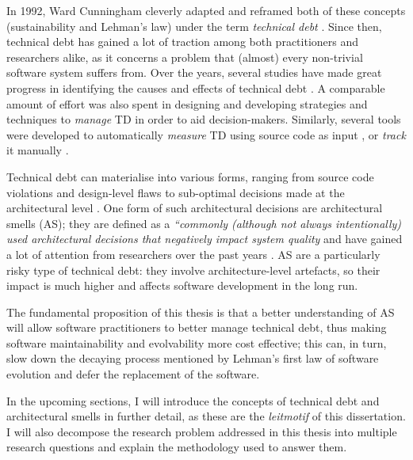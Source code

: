 In 1992, Ward Cunningham cleverly adapted and reframed both of these concepts (sustainability and Lehman's law) under the term \emph{technical debt} \cite{Cunningham1992}. 
Since then, technical debt has gained a lot of traction among both practitioners and researchers alike, as it concerns a problem that (almost) every non-trivial software system suffers from. 
Over the years, several studies have made great progress in identifying the causes and effects of technical debt \cite{Brown2010,Kruchten2012}.
A comparable amount of effort was also spent in designing and developing strategies and techniques to \emph{manage} TD \cite{Li2015} in order to aid decision-makers. 
Similarly, several tools were developed to automatically \emph{measure} TD using source code as input \cite{Avgeriou2021}, or \emph{track} it manually \cite{Martini2016}.

Technical debt can materialise into various forms, ranging from source code violations \cite{Letouzey2012,Curtis2012} and design-level flaws \cite{Marinescu2012} to sub-optimal decisions made at the architectural level \cite{Ernst2015,Yli-Huumo2014}. One form of such architectural decisions are architectural smells (AS); they are defined as a \emph{``commonly (although not always intentionally) used architectural decisions that negatively impact system quality} \cite{Garcia2009} and have gained a lot of attention from researchers over the past years \cite{Verdecchia2018}.
AS are a particularly risky type of technical debt: they involve architecture-level artefacts, so their impact is much higher and affects software development in the long run. 

The fundamental proposition of this thesis is that a better understanding of AS will allow software practitioners to better manage technical debt, thus making software maintainability and evolvability more cost effective; this can, in turn, slow down the decaying process mentioned by Lehman's first law of software evolution and defer the replacement of the software.

In the upcoming sections, I will introduce the concepts of technical debt and architectural smells in further detail, as these are the \emph{leitmotif} of this dissertation.
I will also decompose the research problem addressed in this thesis into multiple research questions and explain the methodology used to answer them.


